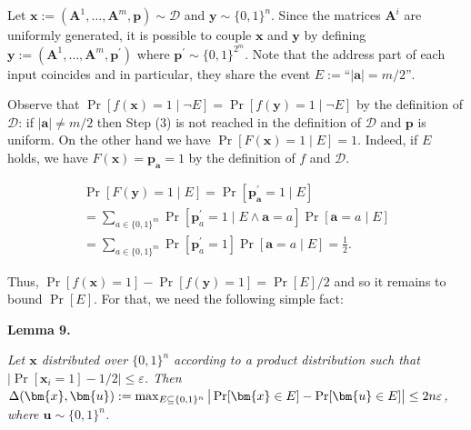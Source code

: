 Let $\bm{x}:=(\bm{A}^{1},\dots,\bm{A}^{m},\bm{p})\sim\mathcal{D}$ and $\bm{y}\sim\{0,1\}^{n}$. Since the matrices $\bm{A}^{i}$ are uniformly generated, it is possible to couple $\bm{x}$ and $\bm{y}$ by defining $\bm{y}:=(\bm{A}^{1},\dots,\bm{A}^{m},\bm{p}^{\prime})$ where $\bm{p}^{\prime}\sim\{0,1\}^{2^{m}}$. Note that the address part of each input coincides and in particular, they share the event $E:=\text{``$|\bm{a}|=m/2$''}$.\par




Observe that $\Pr[f(\bm{x})=1\mid\lnot E]=\Pr[f(\bm{y})=1\mid\lnot E]$ by the definition of $\mathcal{D}$: if $|\bm{a}|\neq m/2$ then Step (3) is not reached in the definition of $\mathcal{D}$ and $\bm{p}$ is uniform. On the other hand we have $\Pr[F(\bm{x})=1\mid E]=1$. Indeed, if $E$ holds, we have $F(\bm{x})=\bm{p}_{\bm{a}}=1$ by the definition of $f$ and $\mathcal{D}$.\par


\[\begin{gathered}
\displaystyle\Pr[F(\bm{y})=1\mid E] \displaystyle=\Pr[\bm{p}^{\prime}_{\bm{a}}=1\mid E] \\
\displaystyle=\sum_{a\in\{0,1\}^{m}}\Pr[\bm{p}^{\prime}_{a}=1\mid E\land\bm{a}=a]\Pr[\bm{a}=a\mid E] \\
\displaystyle=\sum_{a\in\{0,1\}^{m}}\Pr[\bm{p}^{\prime}_{a}=1]\Pr[\bm{a}=a\mid
E]=\frac{1}{2}.
\end{gathered}\]


Thus, $\Pr[f(\bm{x})=1]-\Pr[f(\bm{y})=1]=\Pr[E]/2$ and so it remains to bound $\Pr[E]$. For that, we need the following simple fact:\par





\par\medskip\noindent\textbf{
\textbf{Lemma 9}\textbf{.}
}\par



\emph{Let $\bm{x}$ distributed over $\{0,1\}^{n}$ according to a product distribution such that
$|\Pr[\bm{x}_{i}=1]-1/2|\leq\varepsilon$. Then $\Delta(\bm{x},\bm{u}):=\max_{E\subseteq\{0,1\}^{n}}\big{|}\Pr[\bm{x}\in E]-\Pr[\bm{u}\in E]\big{|}\leq 2n\varepsilon$, where $\bm{u}\sim\{0,1\}^{n}$.}\par






